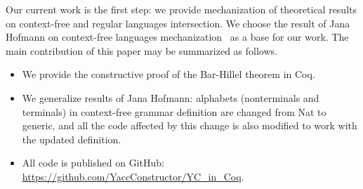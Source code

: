 Our current work is the first step: we provide mechanization of theoretical results on context-free and regular languages intersection.
We choose the result of Jana Hofmann on context-free languages mechanization~\cite{smolkaHofmann2016} as a base for our work.
The main contribution of this paper may be summarized as follows.
\begin{itemize}
\item We provide the constructive proof of the Bar-Hillel theorem in Coq.
\item We generalize results of Jana Hofmann: alphabets (nonterminals and terminals) in context-free grammar definition are changed from Nat to generic, and all the code affected by this change is also modified to work with the updated definition.
\item All code is published on GitHub: \url{https://github.com/YaccConstructor/YC_in_Coq}.
\end{itemize}

